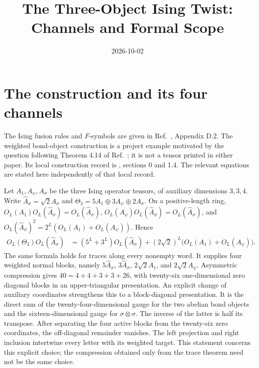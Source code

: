 \documentclass{article}
\title{The Three-Object Ising Twist: Channels and Formal Scope}
\author{}
\date{2026-10-02}
\begin{document}
\maketitle
{}

\section{The construction and its four channels}

The Ising fusion rules and $F$-symbols are given in
Ref.~\cite{Bultinck2017Anyons}, Appendix D.2. The weighted bond-object
construction is a project example motivated by the question following
Theorem 4.14 of Ref.~\cite{Cirac2016MPDO_arXiv}; it is not a tensor printed
in either paper. Its local construction record is
, sections
0 and 1.4. The relevant equations are stated here independently of that
local record.

Let $A_1,A_\psi,A_\sigma$ be the three Ising operator tensors, of auxiliary
dimensions $3,3,4$. Write $\widehat A_\sigma=\sqrt2 A_\sigma$ and
$\Theta_3=5A_1\oplus3A_\psi\oplus2A_\sigma$. On a positive-length ring,
$O_L(A_1)O_L(\widehat A_\sigma)=O_L(\widehat A_\sigma)$,
$O_L(A_\psi)O_L(\widehat A_\sigma)=O_L(\widehat A_\sigma)$, and
$O_L(\widehat A_\sigma)^2=2^L(O_L(A_1)+O_L(A_\psi))$. Hence
\begin{align}
 O_L(\Theta_3)O_L(\widehat A_\sigma)
 &= (5^L+3^L)O_L(\widehat A_\sigma)
  +(2\sqrt2)^L\bigl(O_L(A_1)+O_L(A_\psi)\bigr).
 \label{eq:ising_three_fusion}
\end{align}
The same formula holds for traces along every nonempty word. It supplies
four weighted normal blocks, namely $5\widehat A_\sigma$,
$3\widehat A_\sigma$, $2\sqrt2 A_1$, and $2\sqrt2 A_\psi$.
Asymmetric compression gives $40=4+4+3+3+26$, with twenty-six
one-dimensional zero diagonal blocks in an upper-triangular presentation.
An explicit change of auxiliary coordinates strengthens this to a block-diagonal
presentation. It is the direct sum of the twenty-four-dimensional gauge for
the two abelian bond objects and the sixteen-dimensional gauge for
$\sigma\otimes\sigma$. The inverse of the latter is half its transpose.
After separating the four active blocks from the twenty-six zero coordinates,
the off-diagonal remainder vanishes. The left projection and right inclusion
intertwine every letter with its weighted target. This statement concerns
this explicit choice; the compression obtained only from the trace theorem
need not be the same choice.
\end{document}
